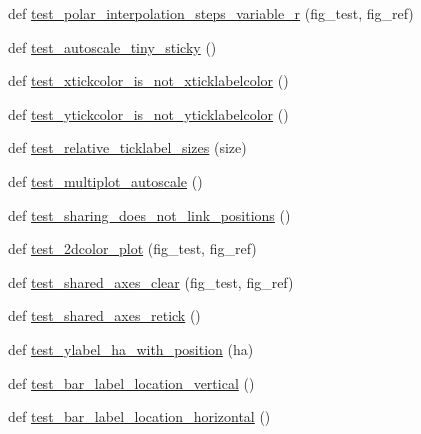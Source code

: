 \begin{DoxyCompactItemize}
\item 
def \hyperlink{namespacematplotlib_1_1tests_1_1test__axes_abb426e2575851259ee9cbbadb4a6ef85}{test\+\_\+polar\+\_\+interpolation\+\_\+steps\+\_\+variable\+\_\+r} (fig\+\_\+test, fig\+\_\+ref)
\item 
def \hyperlink{namespacematplotlib_1_1tests_1_1test__axes_a0aa7709ea4004ad95475e5f00bb57ed4}{test\+\_\+autoscale\+\_\+tiny\+\_\+sticky} ()
\item 
def \hyperlink{namespacematplotlib_1_1tests_1_1test__axes_a2a07e688c1d1221971525c0c8abf913c}{test\+\_\+xtickcolor\+\_\+is\+\_\+not\+\_\+xticklabelcolor} ()
\item 
def \hyperlink{namespacematplotlib_1_1tests_1_1test__axes_ab84a81e9cda57316a9e7cc84fe4eaec8}{test\+\_\+ytickcolor\+\_\+is\+\_\+not\+\_\+yticklabelcolor} ()
\item 
def \hyperlink{namespacematplotlib_1_1tests_1_1test__axes_a2b3698194ed73a8ccd682dd5f8ed066a}{test\+\_\+relative\+\_\+ticklabel\+\_\+sizes} (size)
\item 
def \hyperlink{namespacematplotlib_1_1tests_1_1test__axes_a501bfa65e1f6afc078b2a0e1d5d78bf3}{test\+\_\+multiplot\+\_\+autoscale} ()
\item 
def \hyperlink{namespacematplotlib_1_1tests_1_1test__axes_abc835bcbc0f91ce9359d9cc8fd2fe194}{test\+\_\+sharing\+\_\+does\+\_\+not\+\_\+link\+\_\+positions} ()
\item 
def \hyperlink{namespacematplotlib_1_1tests_1_1test__axes_a038e1255ec57ea4faac09733a9c1b521}{test\+\_\+2dcolor\+\_\+plot} (fig\+\_\+test, fig\+\_\+ref)
\item 
def \hyperlink{namespacematplotlib_1_1tests_1_1test__axes_af25f948262b11d40813ccf0db5629f27}{test\+\_\+shared\+\_\+axes\+\_\+clear} (fig\+\_\+test, fig\+\_\+ref)
\item 
def \hyperlink{namespacematplotlib_1_1tests_1_1test__axes_ac0d88742c91251c90fce2ce8cb9f01b9}{test\+\_\+shared\+\_\+axes\+\_\+retick} ()
\item 
def \hyperlink{namespacematplotlib_1_1tests_1_1test__axes_ab742e1540ce8c06c24c482e466424246}{test\+\_\+ylabel\+\_\+ha\+\_\+with\+\_\+position} (ha)
\item 
def \hyperlink{namespacematplotlib_1_1tests_1_1test__axes_a94def3a675f4f029c94347c97a89b809}{test\+\_\+bar\+\_\+label\+\_\+location\+\_\+vertical} ()
\item 
def \hyperlink{namespacematplotlib_1_1tests_1_1test__axes_a5e17e540418f8e4f7d7f7c53172e743c}{test\+\_\+bar\+\_\+label\+\_\+location\+\_\+horizontal} ()
\item 

\end{DoxyCompactItemize}
